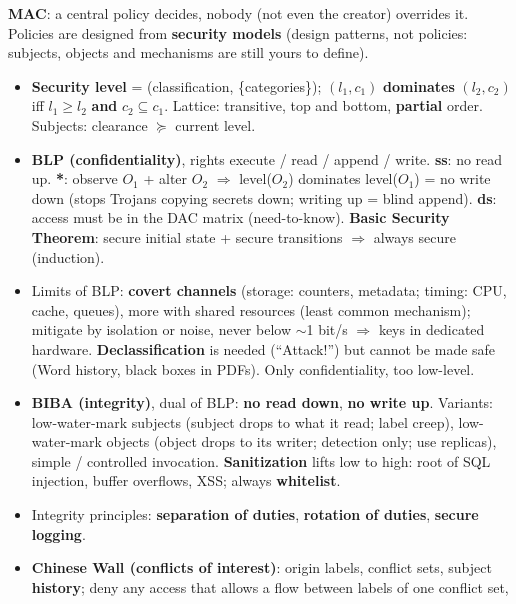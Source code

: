 \begin{recapbox}[title={Exam-ready recap --- Lecture 4: Mandatory Access Control}]
\textbf{MAC}: a central policy decides, nobody (not even the creator) overrides it. Policies are
designed from \textbf{security models} (design patterns, not policies: subjects, objects and
mechanisms are still yours to define).
\begin{itemize}
  \item \textbf{Security level} = (classification, \{categories\}); $(l_1, c_1)$
        \textbf{dominates} $(l_2, c_2)$ iff $l_1 \ge l_2$ \textbf{and} $c_2 \subseteq c_1$.
        Lattice: transitive, top and bottom, \textbf{partial} order. Subjects: clearance
        $\succeq$ current level.
  \item \textbf{BLP (confidentiality)}, rights execute / read / append / write. \textbf{ss}: no
        read up. \textbf{*}: observe $O_1$ + alter $O_2$ $\Rightarrow$ level($O_2$) dominates
        level($O_1$) = no write down (stops Trojans copying secrets down; writing up = blind
        append). \textbf{ds}: access must be in the DAC matrix (need-to-know). \textbf{Basic
        Security Theorem}: secure initial state + secure transitions $\Rightarrow$ always secure
        (induction).
  \item Limits of BLP: \textbf{covert channels} (storage: counters, metadata; timing: CPU, cache,
        queues), more with shared resources (least common mechanism); mitigate by isolation or
        noise, never below $\sim$1 bit/s $\Rightarrow$ keys in dedicated hardware.
        \textbf{Declassification} is needed (``Attack!'') but cannot be made safe (Word history,
        black boxes in PDFs). Only confidentiality, too low-level.
  \item \textbf{BIBA (integrity)}, dual of BLP: \textbf{no read down}, \textbf{no write up}.
        Variants: low-water-mark subjects (subject drops to what it read; label creep),
        low-water-mark objects (object drops to its writer; detection only; use replicas),
        simple / controlled invocation. \textbf{Sanitization} lifts low to high: root of SQL
        injection, buffer overflows, XSS; always \textbf{whitelist}.
  \item Integrity principles: \textbf{separation of duties}, \textbf{rotation of duties},
        \textbf{secure logging}.
  \item \textbf{Chinese Wall (conflicts of interest)}: origin labels, conflict sets, subject
        \textbf{history}; deny any access that allows a flow between labels of one conflict set,

\end{itemize}
\end{recapbox}
